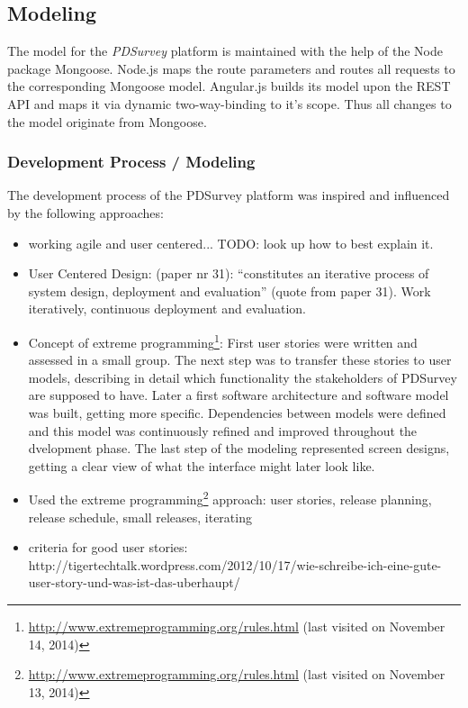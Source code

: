 \subsection{Modeling}
\label{4c_modeling}

	The model for the \textit{PDSurvey} platform is maintained with the help of the Node package Mongoose. Node.js maps the route parameters and routes all requests to the corresponding Mongoose model. Angular.js builds its model upon the REST API and maps it via dynamic two-way-binding to it's scope. Thus all changes to the model originate from Mongoose.



\subsubsection{Development Process / Modeling}

	The development process of the PDSurvey platform was inspired and influenced by the following approaches:

	\begin{itemize}
	\item working agile and user centered... TODO: look up how to best explain it.

	\item User Centered Design: (paper nr 31): ``constitutes an iterative process of system design, deployment and evaluation'' (quote from paper 31). Work iteratively, continuous deployment and evaluation.

	\item Concept of extreme programming\footnote{\url{http://www.extremeprogramming.org/rules.html} (last visited on November 14, 2014)}: First user stories were written and assessed in a small group. The next step was to transfer these stories to user models, describing in detail which functionality the stakeholders of PDSurvey are supposed to have. Later a first software architecture and software model was built, getting more specific. Dependencies between models were defined and this model was continuously refined and improved throughout the dvelopment phase. The last step of the modeling represented screen designs, getting a clear view of what the interface might later look like.

	\item Used the extreme programming\footnote{\url{http://www.extremeprogramming.org/rules.html} (last visited on November 13, 2014)} approach: user stories, release planning, release schedule, small releases, iterating


	\item criteria for good user stories: http://tigertechtalk.wordpress.com/2012/10/17/wie-schreibe-ich-eine-gute-user-story-und-was-ist-das-uberhaupt/
	\end{itemize}








